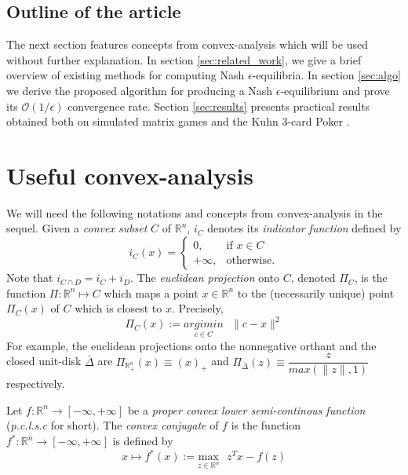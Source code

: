 \documentclass[12pt]{article}
\begin{document}
\subsection{Outline of the article}
The next section features concepts from convex-analysis which will be used without further explanation. In section \ref{sec:related_work}, we give a brief overview of existing methods for computing Nash $\epsilon$-equilibria. In section \ref{sec:algo} we derive the proposed algorithm for producing a Nash $\epsilon$-equilibrium and prove its $\mathcal{O}(1/\epsilon)$ convergence rate. Section \ref{sec:results} presents practical results obtained both on simulated matrix games and the Kuhn 3-card Poker \cite{kuhn}.

\section{Useful convex-analysis}
\label{sec:notation}
We will need the following notations and concepts from convex-analysis in the sequel.
Given a \textit{convex subset} $C$ of $\mathbb{R}^n$, $i_C$ denotes its \textit{indicator function} defined by
\begin{equation}
  i_C(x) = \begin{cases}
    0, &\mbox{if } x \in C\\
    +\infty, &\mbox{otherwise}.
    \end{cases}
  \end{equation}
Note that $i_{C \cap D} = i_C + i_D$. The \textit{euclidean projection} onto $C$, denoted $\Pi_C$, is the function
$\Pi: \mathbb{R}^n \mapsto C$ which maps a point $x \in \mathbb{R}^n$ to the (necessarily unique) point $\Pi_C(x)$ of $C$ which is closest to $x$. Precisely,
\begin{equation}
  \Pi_C(x) := \underset{c \in C}{argimin}\text{ }\|c - x\|^2
\end{equation}
For example, the euclidean projections onto the nonnegative orthant and the closed unit-disk $\bar{\Delta}$
are $\Pi_{\mathbb{R}^n_+}(x) \equiv (x)_+$ and $\Pi_{\bar{\Delta}}(z) \equiv \dfrac{z}{max(\|z\|, 1)}$ respectively.


Let $f : \mathbb{R}^n \rightarrow [-\infty, +\infty]$ be a \textit{proper convex lower semi-continous function}
(\textit{p.c.l.s.c} for short). The \textit{convex conjugate} of $f$ is the function $f^*: \mathbb{R}^n \rightarrow [-\infty, +\infty]$ is defined by
\begin{equation}
  x \mapsto f^*(x) := \underset{z \in \mathbb{R}^n}{\text{max}}\text{ }z^Tx - f(z)
\end{equation}
\end{document}
